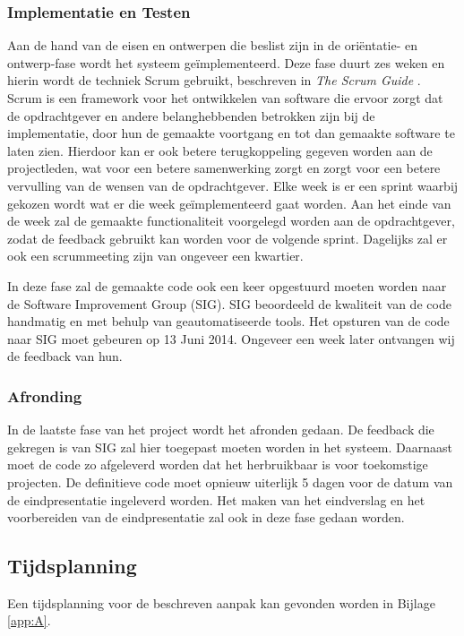 \subsubsection{Implementatie en Testen}
Aan de hand van de eisen en ontwerpen die beslist zijn in de ori\"entatie- en ontwerp-fase wordt het systeem ge\"implementeerd. Deze fase duurt zes weken en hierin wordt de techniek Scrum gebruikt, beschreven in \emph{The Scrum Guide} \cite{schwaber2011}. Scrum is een framework voor het ontwikkelen van software die ervoor zorgt dat de opdrachtgever en andere belanghebbenden betrokken zijn bij de implementatie, door hun de gemaakte voortgang en tot dan gemaakte software te laten zien. Hierdoor kan er ook betere terugkoppeling gegeven worden aan de projectleden, wat voor een betere samenwerking zorgt en zorgt voor een betere vervulling van de wensen van de opdrachtgever. Elke week is er een sprint waarbij gekozen wordt wat er die week ge\"implementeerd gaat worden. Aan het einde van de week zal de gemaakte functionaliteit voorgelegd worden aan de opdrachtgever, zodat de feedback gebruikt kan worden voor de volgende sprint. Dagelijks zal er ook een scrummeeting zijn van ongeveer een kwartier.

In deze fase zal de gemaakte code ook een keer opgestuurd moeten worden naar de Software Improvement Group (SIG). SIG beoordeeld de kwaliteit van de code handmatig en met behulp van geautomatiseerde tools. Het opsturen van de code naar SIG moet gebeuren op 13 Juni 2014. Ongeveer een week later ontvangen wij de feedback van hun.

\subsubsection{Afronding}
In de laatste fase van het project wordt het afronden gedaan. De feedback die gekregen is van SIG zal hier toegepast moeten worden in het systeem. Daarnaast moet de code zo afgeleverd worden dat het herbruikbaar is voor toekomstige projecten. De definitieve code moet opnieuw uiterlijk 5 dagen voor de datum van de eindpresentatie ingeleverd worden. Het maken van het eindverslag en het voorbereiden van de eindpresentatie zal ook in deze fase gedaan worden.

\subsection{Tijdsplanning}
Een tijdsplanning voor de beschreven aanpak kan gevonden worden in Bijlage \ref{app:A}.\\

